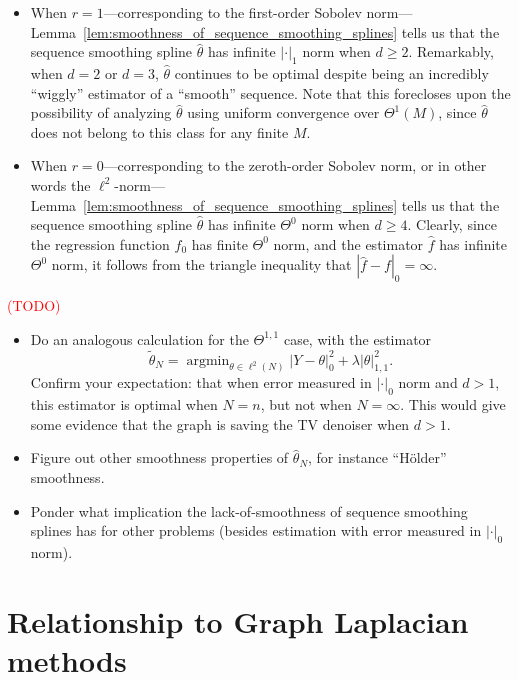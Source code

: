 \documentclass{article}
\newcommand{\1}{\mathbf{1}}
\DeclareMathOperator*{\argmin}{argmin}
\newcommand{\wt}[1]{\widetilde{#1}}
\newcommand{\wh}[1]{\widehat{#1}}
\theoremstyle{alden}
\theoremstyle{aldenthm}
\theoremstyle{definition}
\theoremstyle{remark}
\begin{document}
\begin{itemize}
	\item When $r = 1$---corresponding to the first-order Sobolev norm--- Lemma~\ref{lem:smoothness_of_sequence_smoothing_splines} tells us that the sequence smoothing spline $\wh{\theta}$ has infinite $|\cdot|_1$ norm when $d \geq 2$. Remarkably, when $d = 2$ or $d = 3$, $\wh{\theta}$ continues to be optimal despite being an incredibly ``wiggly'' estimator of a ``smooth'' sequence. Note that this forecloses upon the possibility of analyzing $\wh{\theta}$ using uniform convergence over $\Theta^1(M)$, since $\wh{\theta}$ does not belong to this class for any finite $M$.
	\item When $r = 0$---corresponding to the zeroth-order Sobolev norm, or in other words the $\ell^2$-norm---Lemma~\ref{lem:smoothness_of_sequence_smoothing_splines} tells us that the sequence smoothing spline $\wh{\theta}$ has infinite $\Theta^0$ norm when $d \geq 4$. Clearly, since the regression function $f_0$ has finite $\Theta^0$ norm, and the estimator $\wh{f}$ has infinite $\Theta^0$ norm, it follows from the triangle inequality that $|\wh{f} - f|_0 = \infty$. 
\end{itemize}

\textcolor{red}{(TODO)}
\begin{itemize}
	\item Do an analogous calculation for the $\Theta^{1,1}$ case, with the estimator
	\begin{equation*}
	\wt{\theta}_{N} = \argmin_{\theta \in \ell^2(N)} |Y - \theta|_0^2 + \lambda |\theta|_{1,1}^2.
	\end{equation*}
	 Confirm your expectation: that when error measured in $|\cdot|_0$ norm and $d > 1$, this estimator is optimal when $N = n$, but not when $N = \infty$. This would give some evidence that the graph is saving the TV denoiser when $d > 1$.
	 \item Figure out other smoothness properties of $\wh{\theta}_N$, for instance ``H\"{o}lder'' smoothness.
	 \item Ponder what implication the lack-of-smoothness of sequence smoothing splines has for other problems (besides estimation with error measured in $|\cdot|_0$ norm).
\end{itemize}







\section{Relationship to Graph Laplacian methods}
\end{document}
